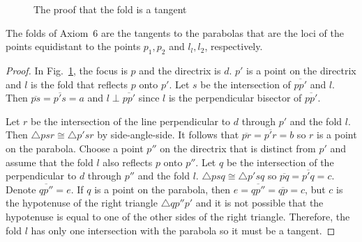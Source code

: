 \newpage

\begin{figure}[thb]
\begin{center}
\end{center}
\caption{The proof that the fold is a tangent}\label{f.tangent-proof}
\end{figure}

\begin{theorem}\label{thm.parabola-tangents}
The folds of Axiom~$6$ are the tangents to the parabolas that are the loci of the points equidistant to the points $p_1,p_2$ and $l_l,l_2$, respectively.
\end{theorem}
\begin{proof}
In Fig.~\ref{f.tangent-proof}, the focus is $p$ and the directrix is $d$. $p'$ is a point on the directrix and $l$ is the fold that reflects $p$ onto $p'$. Let $s$ be the intersection of $\overline{pp'}$ and $l$. Then $\overline{ps}=\overline{p's}=a$ and $l\perp \overline{pp'}$ since $l$ is the perpendicular bisector of $\overline{pp'}$.

Let $r$ be the intersection of the line perpendicular to $d$ through $p'$ and the fold $l$. Then $\triangle psr\cong \triangle p'sr$ by side-angle-side. It follows that 
$\overline{pr}=\overline{p'r}=b$ so $r$ is a point on the parabola. Choose a point $p''$ on the directrix that is distinct from $p'$ and assume that the fold $l$ also reflects $p$ onto $p''$. Let $q$ be the intersection of the perpendicular to $d$ through $p''$ and the fold $l$. $\triangle psq\cong \triangle p'sq$ so $\overline{pq}=\overline{p'q}=c$. Denote $\overline{qp''}=e$. If $q$ is a point on the parabola, then $e=\overline{qp''}=\overline{qp}=c$, but $c$ is the hypotenuse of the right triangle $\triangle qp''p'$ and it is not possible that the hypotenuse is equal to one of the other sides of the right triangle. Therefore, the fold $l$ has only one intersection with the parabola so it must be a tangent.
\end{proof}

